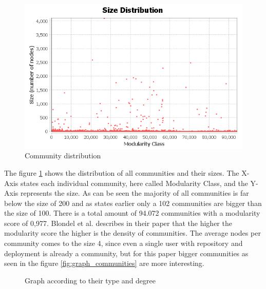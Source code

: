 \begin{figure}[H]
    \centering
    \includegraphics[scale=0.8]{graphics/modularity_stats.png}
    \caption{Community distribution}
    \label{fig:community_distribution}
\end{figure}

The figure \ref{fig:community_distribution} shows the distribution of all communities and their sizes. The X-Axis states each individual community, here called Modularity Class, and the Y-Axis represents the size. As can be seen the majority of all communities is far below the size of 200 and as states earlier only a 102 communities are bigger than the size of 100. There is a total amount of 94.072 communities with a modularity score of 0,977. Blondel et al. describes in their paper that the higher the modularity score the higher is the density of communities\cite{Blondel_2008}. The average nodes per community comes to the size 4, since even a single user with repository and deployment is already a community, but for this paper bigger communities as seen in the figure \ref{fig:graph_communities} are more interesting.

\begin{figure}[H]\centering
{}
    \caption{Graph according to their type and degree}
    \label{fig:graph_types}
\end{figure}

